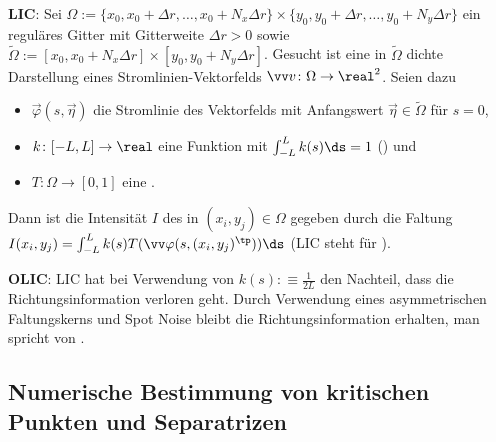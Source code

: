 \linie

\textbf{LIC}:
Sei $\Omega := \{x_0, x_0 + \Delta r, \dotsc, x_0 + N_x \Delta r\} \times
\{y_0, y_0 + \Delta r, \dotsc, y_0 + N_y \Delta r\}$
ein reguläres Gitter mit Gitterweite $\Delta r > 0$ sowie
$\widetilde{\Omega} := [x_0, x_0 + N_x \Delta r] \times [y_0, y_0 + N_y \Delta r]$.
Gesucht ist eine in $\widetilde{\Omega}$ dichte Darstellung eines Stromlinien-Vektorfelds
$\vec{v}\colon \Omega \to \real^2$.
Seien dazu
\begin{itemize}
    \item
    $\vec{\varphi}(s, \vec{\eta})$ die Stromlinie des Vektorfelds
    mit Anfangswert $\vec{\eta} \in \widetilde{\Omega}$ für $s = 0$,

    \item
    $k\colon [-L, L] \to \real$ eine Funktion mit $\int_{-L}^L k(s) \ds = 1$
    () und

    \item
    $T\colon \Omega \to [0, 1]$ eine .
\end{itemize}
Dann ist die Intensität $I$ des  in $(x_i, y_j) \in \Omega$ gegeben durch die
Faltung\\
$I(x_i, y_j) = \int_{-L}^L k(s) T(\vec{\varphi}(s, (x_i, y_j)^\tp)) \ds$
(LIC steht für ).

\textbf{OLIC}:
LIC hat bei Verwendung von $k(s) :\equiv \frac{1}{2L}$ den Nachteil, dass die Richtungsinformation
verloren geht.
Durch Verwendung eines asymmetrischen Faltungskerns und Spot Noise bleibt die Richtungsinformation
erhalten, man spricht von .

\pagebreak

\subsection{%
    Numerische Bestimmung von kritischen Punkten und Separatrizen%
}

